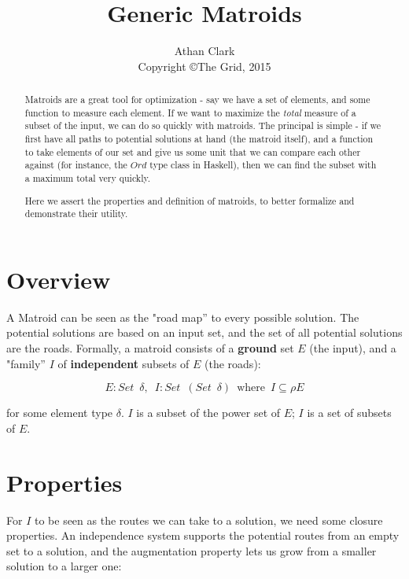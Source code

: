 \documentclass{article}
\newcommand{\where}{\enspace \mathrm{where} \enspace}
\begin{document}
\title{Generic Matroids}
\author{Athan Clark\\ Copyright \copyright \enspace The Grid, 2015}

\maketitle

\begin{abstract}
  Matroids are a great tool for optimization - say we have a set of elements, and
  some function to measure each element. If we want to maximize the \textit{total}
  measure of a subset of the input, we can do so quickly with matroids. The principal
  is simple - if we first have all paths to potential solutions at hand (the matroid itself),
  and a function to take elements of our set and give us some unit that we can compare
  each other against (for instance, the \(Ord\) type class in Haskell), then we can
  find the subset with a maximum total very quickly.

  Here we assert the properties and definition of matroids, to better formalize and
  demonstrate their utility.
\end{abstract}

\section{Overview}

A Matroid can be seen as the "road map'' to every possible solution.
The potential solutions are based on an input set, and the
set of all potential solutions are the roads. Formally, a matroid consists of
a \textbf{ground} set \(E\) (the input), and a "family'' \(I\) of \textbf{independent}
subsets of \(E\) (the roads):

\[
             E : Set \enspace \delta
  , \enspace I : Set \enspace (Set \enspace \delta) \where I \subseteq \rho E
\]

for some element type \(\delta\).
\(I\) is a subset of the power set of \(E\); \(I\) is a set of subsets of \(E\).

\section{Properties}

For \(I\) to be seen as the routes we can take to a solution, we need some closure
properties. An independence system supports the potential routes from an empty set
to a solution, and the augmentation property lets us grow from a smaller solution
to a larger one:
\end{document}
